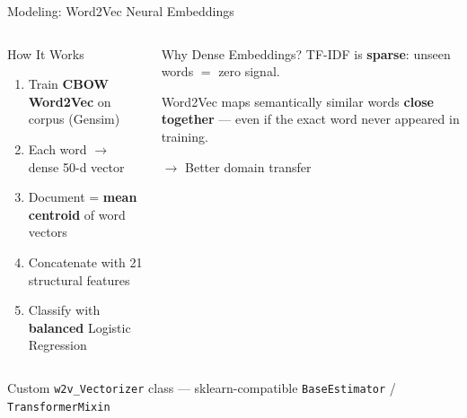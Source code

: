 \documentclass[aspectratio=169, 12pt]{beamer}
\begin{document}
\begin{frame}{Modeling: Word2Vec Neural Embeddings}
\begin{columns}[T]
\begin{block}{How It Works}
\begin{enumerate}
    \item Train \textbf{CBOW Word2Vec} on corpus (Gensim)
    \item Each word $\rightarrow$ dense 50-d vector
    \item Document = \textbf{mean centroid} of word vectors
    \item Concatenate with 21 structural features
    \item Classify with \textbf{balanced} Logistic Regression
\end{enumerate}
\end{block}

\begin{exampleblock}{Why Dense Embeddings?}
\small
TF-IDF is \textbf{sparse}: unseen words $=$ zero signal.

\vspace{6pt}
Word2Vec maps semantically similar words \textbf{close together} --- even if the exact word never appeared in training.

\vspace{6pt}
\textcolor{accentGreen}{$\rightarrow$ Better domain transfer}
\end{exampleblock}
\end{columns}

\vspace{8pt}
\centering
{\small\color{textMuted} Custom \texttt{w2v\_Vectorizer} class --- sklearn-compatible \texttt{BaseEstimator} / \texttt{TransformerMixin}}
\end{frame}
\end{document}
